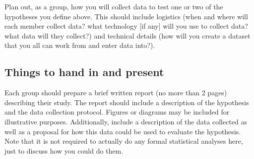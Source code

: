 \documentclass{article}\usepackage[]{graphicx}\usepackage[]{color}
\begin{document}
\vspace{7em}

\begin{exercise}
Plan out, as a group, how you will collect data to test one or two of the hypotheses you define above. This should include logistics (when and where will each member collect data? what technology [if any] will you use to collect data? what data will they collect?) and technical details (how will you create a dataset that you all can work from and enter data into?).
\end{exercise}


\subsection*{Things to hand in and present}

Each group should prepare a brief written report (no more than 2 pages) describing their study. The report should include a description of the hypothesis and the data collection protocol. Figures or diagrams may be included for illustrative purposes. Additionally, include a description of the data collected as well as a proposal for how this data could be used to evaluate the hypothesis. Note that it is not required to actually do any formal statistical analyses here, just to discuss how you could do them. 
\end{document}

